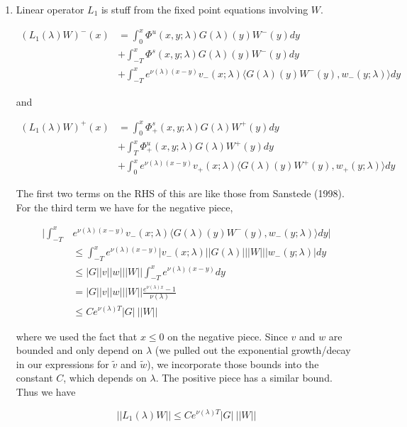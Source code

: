 \documentclass[12pt]{article}
\begin{document}
\begin{enumerate}

\item Linear operator $L_1$ is stuff from the fixed point equations involving $W$.

\begin{align*}
(L_1(\lambda)W)^-(x) &= \int_0^x \Phi^u(x, y; \lambda) G(\lambda)(y)W^-(y) dy \\
&+ \int_{-T}^x \Phi^s(x, y; \lambda) G(\lambda)(y)W^-(y) dy \\
&+ \int_{-T}^x 
e^{\nu(\lambda)(x-y)} v_-(x; \lambda) \langle G(\lambda)(y)W^-(y), w_-(y; \lambda) \rangle dy 
\end{align*}

and

\begin{align*}
(L_1(\lambda)W)^+(x) &= \int_0^x \Phi^s_+(x, y; \lambda) G(\lambda)W^+(y) dy \\
&+ \int_T^x \Phi^u_+(x, y; \lambda) G(\lambda)W^+(y) dy \\
&+ \int_0^x e^{\nu(\lambda)(x-y)} v_+(x; \lambda) \langle G(\lambda)(y)W^+(y), w_+(y; \lambda) \rangle dy
\end{align*}

The first two terms on the RHS of this are like those from Sanstede (1998). For the third term we have for the negative piece,

\begin{align*}
\Big| \int_{-T}^x &e^{\nu(\lambda)(x-y)} v_-(x; \lambda) \langle G(\lambda)(y)W^-(y), w_-(y; \lambda) \rangle dy \Big| \\
&\leq \int_{-T}^x e^{\nu(\lambda)(x-y)} |v_-(x; \lambda)| |G(\lambda)|||W|||w_-(y; \lambda)|dy \\
&\leq |G||v||w|||W|| \int_{-T}^x e^{\nu(\lambda)(x-y)} dy \\
&= |G||v||w|||W|| \frac{e^{\nu(\lambda)x} - 1}{\nu(\lambda)} \\
&\leq C e^{\nu(\lambda)T} |G| \: ||W||
\end{align*}

where we used the fact that $x \leq 0$ on the negative piece. Since $v$ and $w$ are bounded and only depend on $\lambda$ (we pulled out the exponential growth/decay in our expressions for $\tilde{v}$ and $\tilde{w}$), we incorporate those bounds into the constant $C$, which depends on $\lambda$. The positive piece has a similar bound. Thus we have

\[
||L_1(\lambda)W|| \leq C e^{\nu(\lambda)T} |G| \: ||W||
\]


\end{enumerate}
\end{document}
